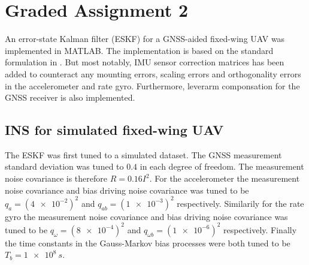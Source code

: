 \section{Graded Assignment 2}\label{sec:graded_assignment_2}


An error-state Kalman filter (ESKF) for a GNSS-aided fixed-wing UAV was implemented in MATLAB. The implementation is based on the standard formulation in \cite{Sola}. But most notably, IMU sensor correction matrices has been added to counteract any mounting errors, scaling errors and orthogonality errors in the accelerometer and rate gyro. Furthermore, leverarm componsation for the GNSS receiver is also implemented.

\subsection{INS for simulated fixed-wing UAV}





The ESKF was first tuned to a simulated dataset. The GNSS measurement standard deviation was tuned to $0.4$ in each degree of freedom. The measurement noise covariance is therefore $R=0.16 I ^2$. For the accelerometer the measurement noise covariance and bias driving noise covariance was tuned to be $q_{a} = (\SI{4e-2})^2$ and $ q_{ab} = (\SI{1e-3})^2$ respectively. Similarily for the rate gyro the measurement noise covariance and bias driving noise covariance was tuned to be $q_{\omega} = (\SI{8e-4})^2$ and $q_{\omega b} = (\SI{1e-6})^2$ respectively. Finally the time constants in the Gauss-Markov bias processes were both tuned to be $T_b = \SI{1e8}{s}$.

